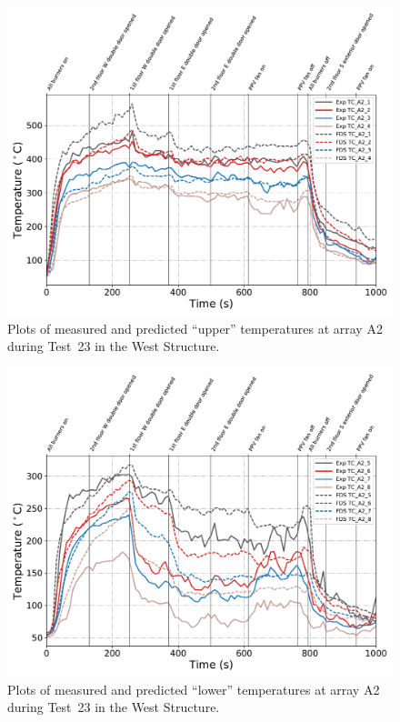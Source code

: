 \begin{figure}[!h]
	\centering
	\includegraphics[width=\columnwidth]{Figures/Plots/Validation/Temperature/Test_23_TC_A2_upper}
	\caption{Plots of measured and predicted ``upper'' temperatures at array A2 during Test~23 in the West Structure.}
	\label{fig:TCA2_upper_data_Test23}
\end{figure}
\begin{figure}[!h]
	\centering
	\includegraphics[width=\columnwidth]{Figures/Plots/Validation/Temperature/Test_23_TC_A2_lower}
	\caption{Plots of measured and predicted ``lower'' temperatures at array A2 during Test~23 in the West Structure.}
	\label{fig:TCA2_lower_data_Test23}
\end{figure}

